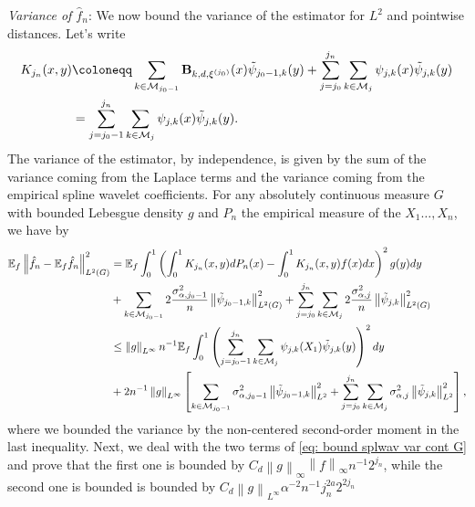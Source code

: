 \documentclass[preprint]{imsart}
\newcommand\norm[1]{\left\lVert#1\right\rVert}
\numberwithin{equation}{section}
\newcounter{cond}
\begin{document}
\begin{appendix}
\textit{Variance of $\hat{f}_n$}: We now bound the variance of the estimator for $L^2$ and pointwise distances. Let's write 
\begin{align*}
K_{j_n}(x,y)&\coloneqq \sum_{k\in\mathcal{M}_{j_0-1}} \mathbf{B}_{k,d,\xi^{(j_0)}}(x) \Tilde{\psi}_{j_0-1,k}(y) + \sum_{j=j_0}^{j_n}\sum_{k\in\mathcal{M}_{j}} \psi_{j,k}(x)\Tilde{\psi}_{j,k}(y)\\
&= \sum_{j=j_0-1}^{j_n}\sum_{k\in\mathcal{M}_{j}} \psi_{j,k}(x)\Tilde{\psi}_{j,k}(y).
\end{align*}
The variance of the estimator, by independence, is given by the sum of the variance coming from the Laplace terms and the variance coming from the empirical spline wavelet coefficients. For any absolutely continuous measure $G$ with bounded Lebesgue density $g$ and $P_n$ the empirical measure of the $X_1\dots,X_n$, we have by
\begin{align} 
\mathbb{E}_f\norm{\hat{f}_n-\mathbb{E}_f\hat{f}_n}_{L^2(G)}^2 &= \mathbb{E}_f\int_0^1 \left(\int_0^1 K_{j_n}(x,y) dP_n(x) - \int_0^1 K_{j_n}(x,y) f(x)dx \right)^2 g(y)dy\nonumber\\
&+\sum_{k\in\mathcal{M}_{j_0-1}} 2\frac{\sigma_{\alpha,j_0-1}^2}{n} \norm{\Tilde{\psi}_{j_0-1,k}}_{L^2(G)}^2 + \sum_{j=j_0}^{j_n}\sum_{k\in\mathcal{M}_{j}} 2\frac{\sigma_{\alpha,j}^2}{n}\norm{\Tilde{\psi}_{j,k}}_{L^2(G)}^2\nonumber\\
&\leq \norm{g}_{L^\infty}n^{-1} \mathbb{E}_f\int_0^1 \left(  \sum_{j=j_0-1}^{j_n}\sum_{k\in\mathcal{M}_{j}} \psi_{j,k}(X_1)\Tilde{\psi}_{j,k}(y) \right)^2dy\nonumber\\
&+2n^{-1}\norm{g}_{L^\infty}\left[\sum_{k\in\mathcal{M}_{j_0-1}} \sigma_{\alpha,j_0-1}^2 \norm{\Tilde{\psi}_{j_0-1,k}}_{L^2}^2 + \sum_{j=j_0}^{j_n}\sum_{k\in\mathcal{M}_{j}} \sigma_{\alpha,j}^2\norm{\Tilde{\psi}_{j,k}}_{L^2}^2\right],\label{eq: bound splwav var cont G}
\end{align}
where we bounded the variance by the non-centered second-order moment in the last inequality. Next, we deal with the two terms of \eqref{eq: bound splwav var cont G} and prove that the first one is bounded by $C_d\norm{g}_{\infty}\norm{f}_{\infty}n^{-1} 2^{j_n}$, while the second one is bounded is bounded by $C_d \norm{g}_{L^\infty}\alpha^{-2} n^{-1} j_n^{2a}2^{2j_n}$




\end{appendix}
\end{document}
